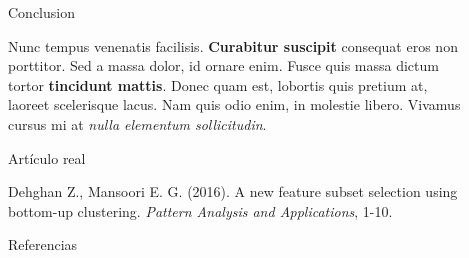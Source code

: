 \documentclass[final]{beamer}
\newlength{\sepwid}
\newlength{\onecolwid}
\newlength{\twocolwid}
\begin{document}
\begin{frame}[t]
\begin{columns}[t]
\begin{column}{\twocolwid}
\begin{columns}[t,totalwidth=\twocolwid]
\begin{column}{\onecolwid}
\end{column} %

\end{columns} %

\end{column} %

\begin{column}{\sepwid}\end{column} %

\begin{column}{\onecolwid} %


\begin{block}{Conclusion}

Nunc tempus venenatis facilisis. \textbf{Curabitur suscipit} consequat eros non porttitor. Sed a massa dolor, id ornare enim. Fusce quis massa dictum tortor \textbf{tincidunt mattis}. Donec quam est, lobortis quis pretium at, laoreet scelerisque lacus. Nam quis odio enim, in molestie libero. Vivamus cursus mi at \textit{nulla elementum sollicitudin}.

\end{block}


\begin{block}{Artículo real}

Dehghan Z., Mansoori E. G. (2016). A new feature subset selection using bottom-up clustering. \textit{Pattern Analysis and Applications}, 1-10.

\end{block}



\begin{block}{Referencias}
\nocite{*} %
\small{}
\begin{thebibliography}{}


\end{thebibliography}
\end{block}
\end{column}
\end{columns}
\end{frame}
\end{document}
